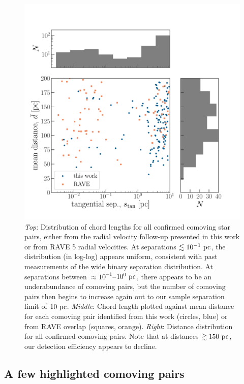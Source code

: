 \documentclass[modern, letterpaper]{aastex61}
\newcommand{\DR}[1]{\acronym{DR}#1}
\begin{document}
\begin{figure}[htbp]
  \begin{center}
    \includegraphics[width=\linewidth]{separation-with-rave.pdf}
  \end{center}
  \caption{%
    \emph{Top}: Distribution of chord lengths for all confirmed comoving star
      pairs, either from the radial velocity follow-up presented in this work or
      from RAVE \DR{5} radial velocities.
      At separations $\lesssim 10^{-1}~\mathrm{pc}$, the distribution (in log-log)
      appears uniform, consistent with past measurements of the wide binary
      separation distribution.
      At separations between $\approx 10^{-1}$--$10^{0}~\mathrm{pc}$, there appears to
      be an underabundance of comoving pairs, but the number of comoving pairs
      then begins to increase again out to our sample separation limit of
      $10~\mathrm{pc}$.
    \emph{Middle}: Chord length plotted against mean distance for each comoving
      pair identified from this work (circles, blue) or from RAVE overlap
      (squares, orange).
    \emph{Right}: Distance distribution for all confirmed comoving pairs.
      Note that at distances $\gtrsim 150~\mathrm{pc}$, our detection efficiency appears
      to decline.
    \label{fig:separation-RAVE}}
\end{figure}

\subsection{A few highlighted comoving pairs}\label{sec:interesting-pairs}
\end{document}
